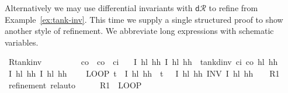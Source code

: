 \documentclass[envcountsame,envcountsect]{llncs}
\newcommand{\dR}{\mathsf{d}\mathcal{R}}
\begin{document}
\begin{example}\label{ex:tank-rinv}
  Alternatively we may use differential invariants with $\dR$ to
  refine  from
  Example~\ref{ex:tank-inv}. This time we supply a single structured
  proof to show another style of refinement.
  We %
  abbreviate long expressions with schematic variables.

\begin{isabellebody}
\isanewline
{}\isamarkupfalse%
\ R{\isacharunderscore}tank{\isacharunderscore}inv{\isacharcolon}\isanewline
\ \ \ {\isachardoublequoteopen}{}\ {\isasymle}\ {\isasymtau}{\isachardoublequoteclose}\ \ {\isachardoublequoteopen}{}\ {\isacharless}\ c\isactrlsub o{\isachardoublequoteclose}\ \ {\isachardoublequoteopen}c\isactrlsub o\ {\isacharless}\ c\isactrlsub i{\isachardoublequoteclose}\isanewline
\ \ \ {\isachardoublequoteopen}\isactrlbold {\isacharbrackleft}I\ h\isactrlsub l\ h\isactrlsub h{\isacharcomma}\ I\ h\isactrlsub l\ h\isactrlsub h\isactrlbold {\isacharbrackright}\ {\isasymge}\ tank{\isacharunderscore}dinv\ c\isactrlsub i\ c\isactrlsub o\ h\isactrlsub l\ h\isactrlsub h\ {\isasymtau}{\isachardoublequoteclose}\isanewline
{}\isamarkupfalse%
{\isacharminus}\isanewline
\ \ \isamarkupfalse%
\ {\isachardoublequoteopen}\isactrlbold {\isacharbrackleft}I\ h\isactrlsub l\ h\isactrlsub h{\isacharcomma}\ I\ h\isactrlsub l\ h\isactrlsub h\isactrlbold {\isacharbrackright}\ {\isasymge}\isanewline
\ \ \ LOOP\ {\isacharparenleft}{\isacharparenleft}t\ {\isacharcolon}{\isacharcolon}{\isacharequal}\ {}{\isacharparenright}{\isacharsemicolon}\isactrlbold {\isacharbrackleft}I\ h\isactrlsub l\ h\isactrlsub h\ {\isasymand}\ t\ {\isacharequal}\ {}{\isacharcomma}\ I\ h\isactrlsub l\ h\isactrlsub h\isactrlbold {\isacharbrackright}{\isacharparenright}\ INV\ I\ h\isactrlsub l\ h\isactrlsub h{\isachardoublequoteclose}\ {\isacharparenleft}\ {\isachardoublequoteopen}{\isacharunderscore}\ {\isasymge}\ {\isacharquery}R1{\isachardoublequoteclose}{\isacharparenright}\isanewline
\ \ \ \ \isamarkupfalse%
\ {\isacharparenleft}refinement{\isacharcomma}\ rel{\isacharunderscore}auto{\isacharprime}{\isacharparenright}\isanewline
\ \ \isamarkupfalse%
\ \isamarkupfalse%
\ {\isachardoublequoteopen}{\isacharquery}R1\ {\isasymge}\ LOOP\isanewline

\end{isabellebody}
\end{example}
\end{document}

